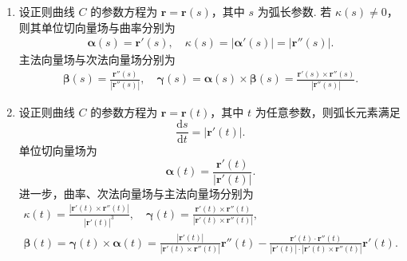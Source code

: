 \documentclass[../../main.tex]{subfiles}%
\begin{document}
\begin{theorem}[曲线论基本公式]\label{theorem:曲线论基本公式}
\begin{enumerate}
\item 设正则曲线 $C$ 的参数方程为 $\bm{r} = \bm{r}(s)$，其中 $s$ 为弧长参数.
若 $\kappa(s) \neq 0$，则其单位切向量场与曲率分别为
\begin{align*}
\bm{\alpha}(s) = \bm{r}'(s), \quad 
\kappa(s) = |\bm{\alpha}'(s)| = |\bm{r}''(s)|.
\end{align*}
主法向量场与次法向量场分别为
\begin{align*}
\bm{\beta}(s) = \frac{\bm{r}''(s)}{|\bm{r}''(s)|}, \quad
\bm{\gamma}(s) = \bm{\alpha}(s) \times \bm{\beta}(s) = \frac{\bm{r}'(s) \times \bm{r}''(s)}{|\bm{r}''(s)|}.
\end{align*}

\item 设正则曲线 $C$ 的参数方程为 $\bm{r} = \bm{r}(t)$，其中 $t$ 为任意参数，则弧长元素满足
\[
\frac{\mathrm{d}s}{\mathrm{d}t} = |\bm{r}'(t)|.
\]
单位切向量场为
\[
\bm{\alpha}(t) = \frac{\bm{r}'(t)}{|\bm{r}'(t)|}.
\]
进一步，曲率、次法向量场与主法向量场分别为
\begin{gather*}
\kappa(t) = \frac{|\bm{r}'(t) \times \bm{r}''(t)|}{|\bm{r}'(t)|^3}, \quad
\bm{\gamma}(t) = \frac{\bm{r}'(t) \times \bm{r}''(t)}{|\bm{r}'(t) \times \bm{r}''(t)|}, \\
\bm{\beta}(t) = \bm{\gamma}(t) \times \bm{\alpha}(t) = \frac{|\bm{r}'(t)|}{|\bm{r}'(t) \times \bm{r}''(t)|}\bm{r}''(t) - \frac{\bm{r}'(t) \cdot \bm{r}''(t)}{|\bm{r}'(t)| \cdot |\bm{r}'(t) \times \bm{r}''(t)|}\bm{r}'(t).
\end{gather*}
\end{enumerate}
\end{theorem}
\end{document}
